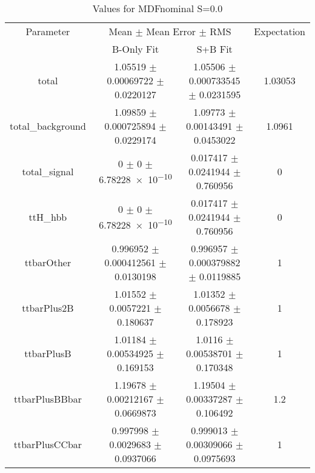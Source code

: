 \begin{table}
\centering
\caption{Values for MDFnominal S=0.0}
\begin{tabular}{cccc}
\toprule
Parameter & \multicolumn{2}{c}{Mean $\pm$ Mean Error $\pm$ RMS} & Expectation\\
 & B-Only Fit & S+B Fit & \\
\midrule
total & \num{1.05519} $\pm$ \num{0.00069722} $\pm$ \num{0.0220127} & \num{1.05506} $\pm$ \num{0.000733545} $\pm$ \num{0.0231595} & \num{1.03053}\\
total\_background & \num{1.09859} $\pm$ \num{0.000725894} $\pm$ \num{0.0229174} & \num{1.09773} $\pm$ \num{0.00143491} $\pm$ \num{0.0453022} & \num{1.0961}\\
total\_signal & \num{0} $\pm$ \num{0} $\pm$ \num{6.78228e-10} & \num{0.017417} $\pm$ \num{0.0241944} $\pm$ \num{0.760956} & \num{0}\\
ttH\_hbb & \num{0} $\pm$ \num{0} $\pm$ \num{6.78228e-10} & \num{0.017417} $\pm$ \num{0.0241944} $\pm$ \num{0.760956} & \num{0}\\
ttbarOther & \num{0.996952} $\pm$ \num{0.000412561} $\pm$ \num{0.0130198} & \num{0.996957} $\pm$ \num{0.000379882} $\pm$ \num{0.0119885} & \num{1}\\
ttbarPlus2B & \num{1.01552} $\pm$ \num{0.0057221} $\pm$ \num{0.180637} & \num{1.01352} $\pm$ \num{0.0056678} $\pm$ \num{0.178923} & \num{1}\\
ttbarPlusB & \num{1.01184} $\pm$ \num{0.00534925} $\pm$ \num{0.169153} & \num{1.0116} $\pm$ \num{0.00538701} $\pm$ \num{0.170348} & \num{1}\\
ttbarPlusBBbar & \num{1.19678} $\pm$ \num{0.00212167} $\pm$ \num{0.0669873} & \num{1.19504} $\pm$ \num{0.00337287} $\pm$ \num{0.106492} & \num{1.2}\\
ttbarPlusCCbar & \num{0.997998} $\pm$ \num{0.0029683} $\pm$ \num{0.0937066} & \num{0.999013} $\pm$ \num{0.00309066} $\pm$ \num{0.0975693} & \num{1}\\
\bottomrule
\end{tabular}
\end{table}